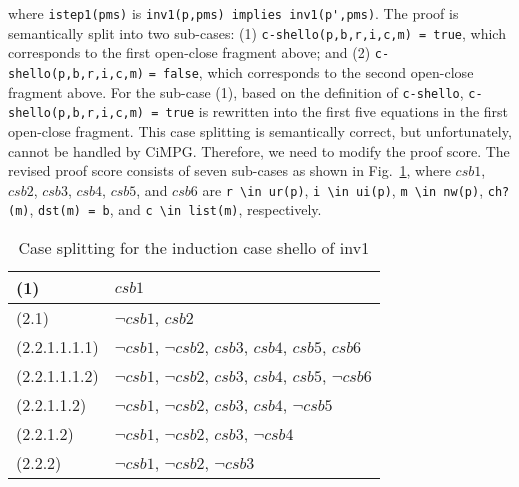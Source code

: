 \documentclass[a4paper,fleqn]{cas-dc}
\begin{document}
\noindent
where \verb!istep1(pms)! is \verb!inv1(p,pms) implies inv1(p',pms)!.
The proof is semantically split into two sub-cases: (1)  \verb!c-shello(p,b,r,i,c,m) = true!, which corresponds to the first open-close fragment above; 
and (2) \verb!c-shello(p,b,r,i,c,m)! \verb!= false!,
which corresponds to the second open-close fragment above. 
For the sub-case (1), based on the definition of \verb!c-shello!,  \verb!c-shello(p,b,r,i,c,m) = true! is rewritten into the first five equations in the first open-close fragment. 
This case splitting is semantically correct, but unfortunately, cannot be handled by CiMPG. Therefore, we need to modify the proof score.
The revised proof score consists of seven sub-cases as shown in Fig.~\ref{fig-cs-inv1}, where $csb1$, $csb2$, $csb3$, $csb4$, $csb5$, and $csb6$ are
 \verb!r \in ur(p)!,
 \verb!i \in ui(p)!,
 \verb!m \in nw(p)!,
 \verb!ch?(m)!,
 \verb!dst(m) = b!, and
 \verb!c \in list(m)!, respectively.


\noindent
\begin{table}[]
	\begin{tabular}{l|l}
		\hline
		(1)           & $csb1$                                                                     \\ \hline
		(2.1)         & $\neg csb1$, $csb2$                                                       \\ \hline
		(2.2.1.1.1.1) & $\neg csb1$, $\neg csb2$, $csb3$, $csb4$, $csb5$, $csb6$  \\ \hline
		(2.2.1.1.1.2) & $\neg csb1$, $\neg csb2$, $csb3$, $csb4$, $csb5$, $\neg csb6$ \\ \hline
		(2.2.1.1.2)   & $\neg csb1$, $\neg csb2$, $csb3$, $csb4$, $\neg csb5$              \\ \hline
		(2.2.1.2)     & $\neg csb1$, $\neg csb2$, $csb3$, $\neg csb4$                           \\ \hline
		(2.2.2)       & $\neg csb1$, $\neg csb2$, $\neg csb3$                                        \\ \hline
	\end{tabular}
\caption{Case splitting for the induction case shello of inv1}
\label{fig-cs-inv1}
\end{table}
\end{document}

